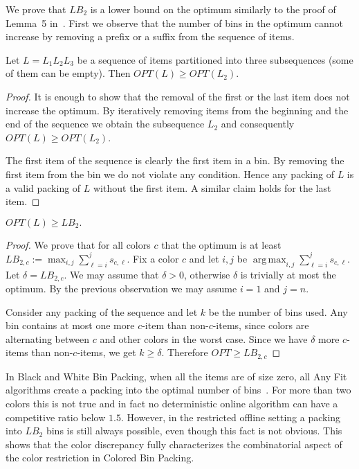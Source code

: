\documentclass[11pt,a4paper]{article}
\def\vari#1{\mathit{#1}}
\DeclareMathOperator*{\argmax}{arg\,max}
\begin{document}
We prove that $\vari{LB_2}$ is a lower bound on the optimum similarly to the proof of Lemma~5 in~\cite{balogh14}.
First we observe that the number of bins in the optimum cannot increase by removing a prefix or a suffix
from the sequence of items.

\begin{observation}
Let $L = L_1 L_2 L_3$ be a sequence of items partitioned into three subsequences (some of them can be empty).
Then $\vari{OPT}(L) \geq \vari{OPT}(L_2).$ 
\end{observation}

\begin{proof}
It is enough to show that the removal of the first or the last item does not increase the optimum. 
By iteratively removing items from the beginning and the end of the sequence we obtain the subsequence $L_2$
and consequently $\vari{OPT}(L) \geq \vari{OPT}(L_2)$.

The first item of the sequence is clearly the first item in a bin. By removing the first item from the bin we do not violate any condition.
Hence any packing of $L$ is a valid packing of $L$ without the first item.
A similar claim holds for the last item.
\end{proof}

\begin{lemma}
$\vari{OPT}(L) \geq \vari{LB_2}.$ 
\end{lemma}

\begin{proof}
We prove that for all colors $c$ that the optimum is at least $\vari{LB_{2,c}} := \max_{i, j} \sum_{\ell=i}^{j} s_{c,\ell}$.
Fix a color $c$ and let $i, j$ be $\argmax_{i, j} \sum_{\ell=i}^{j} s_{c,\ell}$.
Let $\delta = \vari{LB_{2,c}}$. We may assume that $\delta > 0$, otherwise $\delta$ is trivially at most the optimum.
By the previous observation we may assume $i = 1$ and $j = n$.

Consider any packing of the sequence and let $k$ be the number of bins used.
Any bin contains at most one more $c$-item than non-$c$-items,
since colors are alternating between $c$ and other colors in the worst case.
Since we have $\delta$ more $c$-items than non-$c$-items, we get $k\geq \delta$.
Therefore $\vari{OPT} \geq \vari{LB_{2,c}}$
\end{proof}

In Black and White Bin Packing, when all the items are of size zero,
all Any Fit algorithms create a packing into the optimal number of
bins~\cite{balogh14}.  For more than two colors this is not true and
in fact no deterministic online algorithm can have a competitive ratio
below $1.5$.  However, in the restricted offline setting a packing
into $\vari{LB_2}$ bins is still always possible, even though this fact
is not obvious. This shows that the color discrepancy fully characterizes the
combinatorial aspect of the color restriction in Colored Bin Packing.
\end{document}

